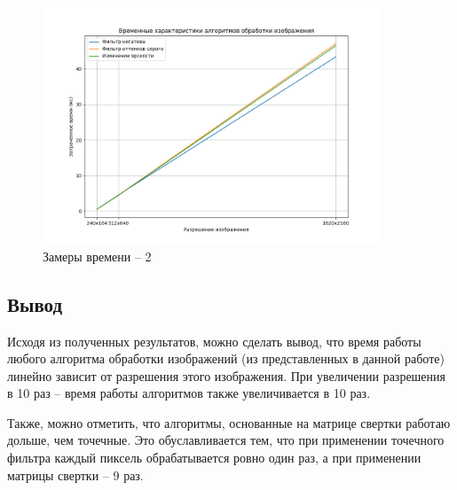 \begin{figure}[hbtp]
	\centering
	\includegraphics[width=0.9\textwidth]{img/graph2.png}
	\caption{\label{img:graph2} Замеры времени -- 2}
\end{figure}

\subsection*{Вывод}
Исходя из полученных результатов, можно сделать вывод, что время работы любого алгоритма обработки изображений (из представленных в данной работе) линейно зависит от разрешения этого изображения. При увеличении разрешения в 10 раз -- время работы алгоритмов также увеличивается в 10 раз.

Также, можно отметить, что алгоритмы, основанные на матрице свертки работаю дольше, чем точечные. Это обуславливается тем, что при применении точечного фильтра каждый пиксель обрабатывается ровно один раз, а при применении матрицы свертки -- 9 раз.

\pagebreak